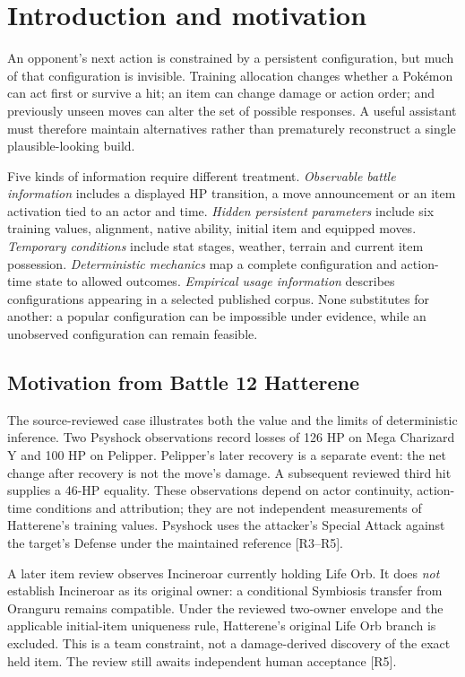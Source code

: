 \documentclass[10pt,a4paper]{article}
\begin{document}
\section{Introduction and motivation}
An opponent's next action is constrained by a persistent configuration, but much of that configuration is invisible. Training allocation changes whether a Pok\'emon can act first or survive a hit; an item can change damage or action order; and previously unseen moves can alter the set of possible responses. A useful assistant must therefore maintain alternatives rather than prematurely reconstruct a single plausible-looking build.

Five kinds of information require different treatment. \emph{Observable battle information} includes a displayed HP transition, a move announcement or an item activation tied to an actor and time. \emph{Hidden persistent parameters} include six training values, alignment, native ability, initial item and equipped moves. \emph{Temporary conditions} include stat stages, weather, terrain and current item possession. \emph{Deterministic mechanics} map a complete configuration and action-time state to allowed outcomes. \emph{Empirical usage information} describes configurations appearing in a selected published corpus. None substitutes for another: a popular configuration can be impossible under evidence, while an unobserved configuration can remain feasible.

\subsection{Motivation from Battle 12 Hatterene}
The source-reviewed case illustrates both the value and the limits of deterministic inference. Two Psyshock observations record losses of 126 HP on Mega Charizard Y and 100 HP on Pelipper. Pelipper's later recovery is a separate event: the net change after recovery is not the move's damage. A subsequent reviewed third hit supplies a 46-HP equality. These observations depend on actor continuity, action-time conditions and attribution; they are not independent measurements of Hatterene's training values. Psyshock uses the attacker's Special Attack against the target's Defense under the maintained reference [R3--R5].

A later item review observes Incineroar currently holding Life Orb. It does \emph{not} establish Incineroar as its original owner: a conditional Symbiosis transfer from Oranguru remains compatible. Under the reviewed two-owner envelope and the applicable initial-item uniqueness rule, Hatterene's original Life Orb branch is excluded. This is a team constraint, not a damage-derived discovery of the exact held item. The review still awaits independent human acceptance [R5].
\end{document}
